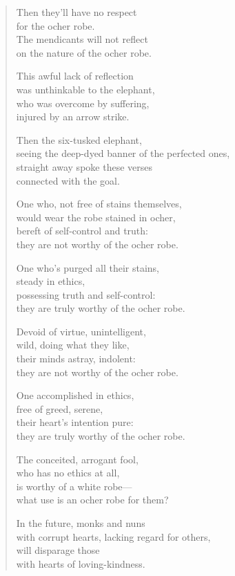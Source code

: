 \documentclass[12pt,openany]{book}%
\begin{document}
\begin{verse}
Then they’ll have no respect \\
for the ocher robe. \\
The mendicants will not reflect \\
on the nature of the ocher robe. 

This awful lack of reflection \\
was unthinkable to the elephant, \\
who was overcome by suffering, \\
injured by an arrow strike. 

Then the six-tusked elephant, \\
seeing the deep-dyed banner of the perfected ones, \\
straight away spoke these verses \\
connected with the goal. 

One who, not free of stains themselves, \\
would wear the robe stained in ocher, \\
bereft of self-control and truth: \\
they are not worthy of the ocher robe. 

One who’s purged all their stains, \\
steady in ethics, \\
possessing truth and self-control: \\
they are truly worthy of the ocher robe. 

Devoid of virtue, unintelligent, \\
wild, doing what they like, \\
their minds astray, indolent: \\
they are not worthy of the ocher robe. 

One accomplished in ethics, \\
free of greed, serene, \\
their heart’s intention pure: \\
they are truly worthy of the ocher robe. 

The conceited, arrogant fool, \\
who has no ethics at all, \\
is worthy of a white robe—\\
what use is an ocher robe for them? 

In the future, monks and nuns \\
with corrupt hearts, lacking regard for others, \\
will disparage those \\
with hearts of loving-kindness. 


\end{verse}
\end{document}
